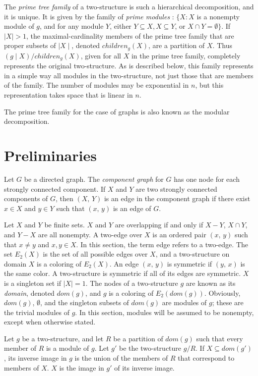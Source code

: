 The \textit{prime tree family} of a two-structure is such a hierarchical decomposition, and it is unique.
It is given by the family of \textit{prime modules} : $\{X : X$ is a nonempty module of $g$, and for any module $Y$, either $Y \subseteq X, X \subseteq Y$, or $X \cap Y = \emptyset\}$.
If $\mid X \mid > 1$, the maximal-cardinality members of the prime tree family that are proper subsets of $\mid X \mid$, denoted $children_g(X)$, are a partition of $X$.
Thus $(g \mid X) / children_g(X)$, given for all $X$ in the prime tree family, completely represents the original two-structure.
As is described below, this family represents in a simple way all modules in the two-structure, not just those that are members of the family.
The number of modules may be exponential in $n$, but this representation takes space that is linear in $n$.

The prime tree family for the case of graphs is also known as the modular decomposition\cite{IMD}.


\section{Preliminaries}\label{sec:preliminaries}

Let $G$ be a directed graph.
The \textit{component graph} for $G$ has one node for each strongly connected component.
If $X$ and $Y$ are two strongly connected components of $G$, then $(X,\, Y)$ is an edge in the component graph if there exist $x \in X$ and $y \in Y$ such that $(x,\, y)$ is an edge of $G$.

Let $X$ and $Y$ be finite sets.
$X$ and $Y$ are overlapping if and only if $X - Y$, $ X \cap Y$, and $Y - X$ are all nonempty.
A two-edge over $X$ is an ordered pair $(x,\, y)$ such that $x \neq y$ and $x, y \in X$.
In this section, the term edge refers to a two-edge.
The set $E_2(X)$ is the set of all possible edges over $X$, and a two-structure on domain $X$ is a coloring of $E_2(X)$.
An edge $(x,\, y)$ is symmetric if $(y,\, x)$ is the same color.
A two-structure is symmetric if all of its edges are symmetric.
$X$ is a singleton set if $\mid X \mid = 1$.
The nodes of a two-structure $g$ are known as its \textit{domain}, denoted $dom(g)$, and $g$ is a coloring of $E_2(dom(g))$.
Obviously, $dom(g)$, $\emptyset$, and the singleton subsets of $dom(g)$ are modules of $g$; these are the trivial modules of $g$.
In this section, modules will be assumed to be nonempty, except when otherwise stated.

Let $g$ be a two-structure, and let $R$ be a partition of $dom(g)$ such that every member of $R$ is a module of $g$.
Let $g'$ be the two-structure $g / R$.
If $X \subseteq dom(g')$, its inverse image in $g$ is the union of the members of $R$ that correspond to members of $X$.
$X$ is the image in $g'$ of its inverse image.

